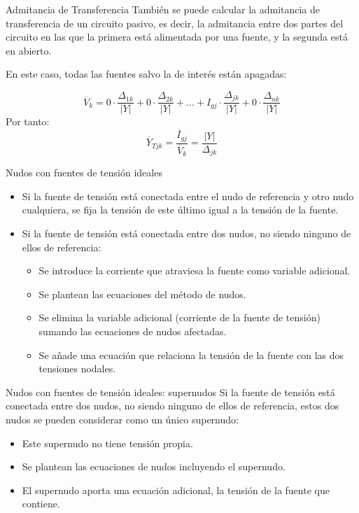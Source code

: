 \documentclass[aspectratio=169, usenames,svgnames,dvipsnames]{beamer}
\begin{document}
\begin{frame}[label={sec:org75923a0}]{Admitancia de Transferencia}
También se puede calcular la admitancia de transferencia de un circuito pasivo, es decir, la admitancia entre dos partes del circuito en las que la primera está alimentada por una fuente, y la segunda está en abierto.

En este caso, todas las fuentes salvo la de interés están apagadas:

\[
  \overline{V}_k = 0 \cdot \frac{\Delta_{1k}}{|Y|} + 0 \cdot \frac{\Delta_{2k}}{|Y|} + \dots + I_{gj} \cdot \frac{\Delta_{jk}}{|Y|} + 0 \cdot \frac{\Delta_{nk}}{|Y|}
\]
Por tanto:
\[
  \boxed{\overline{Y}_{Tjk} = \frac{\overline{I}_{gj}}{\overline{V}_k}=  \frac{|Y|}{\Delta_{jk}}}
\]
\end{frame}


\begin{frame}[label={sec:orge46b433}]{Nudos con fuentes de tensión ideales}
\begin{itemize}
\item Si la fuente de tensión está conectada entre el nudo de referencia y otro nudo cualquiera, se fija la tensión de este último igual a la tensión de la fuente.
\item Si la fuente de tensión está conectada entre dos nudos, no siendo ninguno de ellos de referencia:
\begin{itemize}
\item Se introduce la corriente que atraviesa la fuente como variable adicional.
\item Se plantean las ecuaciones del método de nudos.
\item Se elimina la variable adicional (corriente de la fuente de tensión) sumando las ecuaciones de nudos afectadas.
\item Se añade una ecuación que relaciona la tensión de la fuente con las dos tensiones nodales.
\end{itemize}
\end{itemize}
\end{frame}

\begin{frame}[label={sec:org46fbccd}]{Nudos con fuentes de tensión ideales: supernudos}
Si la fuente de tensión está conectada entre dos nudos, no siendo ninguno de ellos de referencia, estos dos nudos se pueden considerar como un único supernudo:
\begin{itemize}
\item Este supernudo no tiene tensión propia.
\item Se plantean las ecuaciones de nudos incluyendo el supernudo.
\item El supernudo aporta una ecuación adicional, la tensión de la fuente que contiene.
\end{itemize}
\end{frame}
\end{document}
